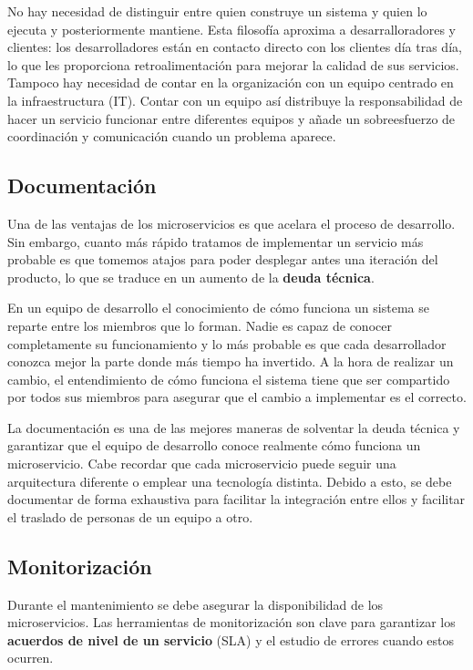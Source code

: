 \documentclass[11pt,spanish,listoffigures]{tfgetsinf}
\begin{document}
No hay necesidad de distinguir entre quien construye un sistema y quien lo ejecuta y posteriormente mantiene. Esta filosofía aproxima a desarralloradores y clientes: los desarrolladores están en contacto directo con los clientes día tras día, lo que les proporciona retroalimentación para mejorar la calidad de sus servicios. Tampoco hay necesidad de contar en la organización con un equipo centrado en la infraestructura (IT). Contar con un equipo así distribuye la responsabilidad de hacer un servicio funcionar entre diferentes equipos y añade un sobreesfuerzo de coordinación y comunicación cuando un problema aparece. \cite{Vliet2011}

\subsection{Documentación}

Una de las ventajas de los microservicios es que acelara el proceso de desarrollo. Sin embargo, cuanto más rápido tratamos de implementar un servicio más probable es que tomemos atajos para poder desplegar antes una iteración del producto, lo que se traduce en un aumento de la \textbf{deuda técnica}. \cite{FowlerSusan}

En un equipo de desarrollo el conocimiento de cómo funciona un sistema se reparte entre los miembros que lo forman. Nadie es capaz de conocer completamente su funcionamiento y lo más probable es que cada desarrollador conozca mejor la parte donde más tiempo ha invertido. A la hora de realizar un cambio, el entendimiento de cómo funciona el sistema tiene que ser compartido por todos sus miembros para asegurar que el cambio a implementar es el correcto.

La documentación es una de las mejores maneras de solventar la deuda técnica y garantizar que el equipo de desarrollo conoce realmente cómo funciona un microservicio. Cabe recordar que cada microservicio puede seguir una arquitectura diferente o emplear una tecnología distinta. Debido a esto, se debe documentar de forma exhaustiva para facilitar la integración entre ellos y facilitar el traslado de personas de un equipo a otro.

\subsection{Monitorización}

Durante el mantenimiento se debe asegurar la disponibilidad de los microservicios. Las herramientas de monitorización son clave para garantizar los \textbf{acuerdos de nivel de un servicio} (SLA) y el estudio de errores cuando estos ocurren.
\end{document}
